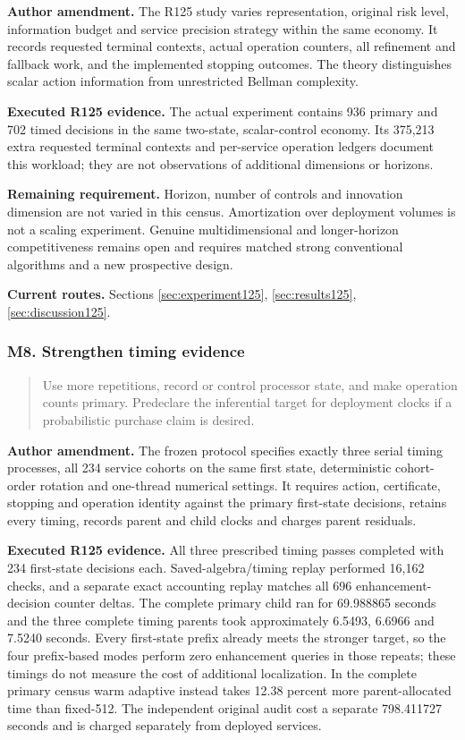 \noindent\textbf{Author amendment.} The R125 study varies representation, original risk level, information budget and service precision strategy within the same economy. It records requested terminal contexts, actual operation counters, all refinement and fallback work, and the implemented stopping outcomes. The theory distinguishes scalar action information from unrestricted Bellman complexity.

\noindent\textbf{Executed R125 evidence.} The actual experiment contains 936 primary and 702 timed decisions in the same two-state, scalar-control economy. Its 375,213 extra requested terminal contexts and per-service operation ledgers document this workload; they are not observations of additional dimensions or horizons.

\noindent\textbf{Remaining requirement.} Horizon, number of controls and innovation dimension are not varied in this census. Amortization over deployment volumes is not a scaling experiment. Genuine multidimensional and longer-horizon competitiveness remains open and requires matched strong conventional algorithms and a new prospective design.

\noindent\textbf{Current routes.} Sections \ref{sec:experiment125}, \ref{sec:results125}, \ref{sec:discussion125}.

\subsubsection{M8. Strengthen timing evidence}

\begin{quote}\small
Use more repetitions, record or control processor state, and make operation counts primary. Predeclare the inferential target for deployment clocks if a probabilistic purchase claim is desired.
\end{quote}

\noindent\textbf{Author amendment.} The frozen protocol specifies exactly three serial timing processes, all 234 service cohorts on the same first state, deterministic cohort-order rotation and one-thread numerical settings. It requires action, certificate, stopping and operation identity against the primary first-state decisions, retains every timing, records parent and child clocks and charges parent residuals.

\noindent\textbf{Executed R125 evidence.} All three prescribed timing passes completed with 234 first-state decisions each. Saved-algebra/timing replay performed 16,162 checks, and a separate exact accounting replay matches all 696 enhancement-decision counter deltas. The complete primary child ran for 69.988865 seconds and the three complete timing parents took approximately 6.5493, 6.6966 and 7.5240 seconds. Every first-state prefix already meets the stronger target, so the four prefix-based modes perform zero enhancement queries in those repeats; these timings do not measure the cost of additional localization. In the complete primary census warm adaptive instead takes 12.38 percent more parent-allocated time than fixed-512. The independent original audit cost a separate 798.411727 seconds and is charged separately from deployed services.

